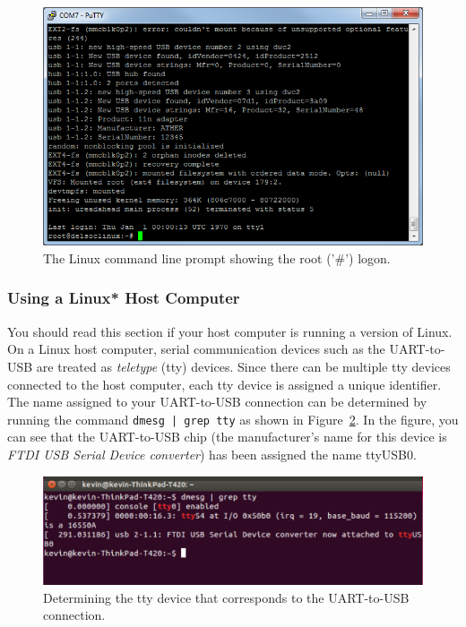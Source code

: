\documentclass[11pt, twoside, pdftex]{article}
\begin{document}
\begin{figure}[H]
   \begin{center}
       \includegraphics[scale=0.7]{figures/fig_putty_tut_4}
   \end{center}
   \caption{The Linux command line prompt showing the root ('\#') logon.}
	\label{fig:putty_4}
\end{figure}

\subsubsection{Using a Linux* Host Computer}

You should read this section if your host computer is running a version of Linux.
On a Linux host computer, serial communication devices such as the UART-to-USB are treated 
as \textit{teletype} (tty) devices. Since there can be multiple tty devices connected to
the host computer, each tty device is assigned a unique identifier. The name assigned to your 
UART-to-USB connection
can be determined by running the command \texttt{dmesg | grep tty} as shown in 
Figure~\ref{fig:dmesg}. In the figure, you can see that the UART-to-USB chip (the manufacturer's
name for this device is \textit{FTDI USB Serial Device converter}) has been assigned the name 
ttyUSB0.

\begin{figure}[H]
   \begin{center}
       \includegraphics[scale=0.5]{figures/new_tty.png}
   \end{center}
   \caption{Determining the tty device that corresponds to the UART-to-USB connection.}
	\label{fig:dmesg}
\end{figure}
\end{document}
